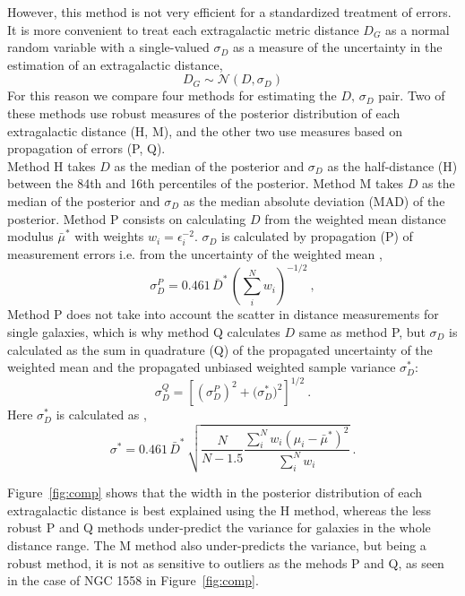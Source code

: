 \documentclass[a4paper,fleqn,usenatbib]{mnras}
\begin{document}
However, this method is not very efficient for a standardized treatment of errors. It is more convenient to treat each extragalactic metric distance $D_G$ as a normal random variable with a single-valued $\sigma_D$ as a measure of the uncertainty in the estimation of an extragalactic distance,
\[D_G\sim \mathcal{N}(D,\sigma_D)\]
For this reason we compare four methods for estimating the $D,\,\sigma_D$ pair. Two of these methods use robust measures of the posterior distribution of each extragalactic distance (H, M), and the other two use measures based on propagation of errors (P, Q).\\

Method H takes $D$ as the median of the posterior and $\sigma_D$ as the half-distance (H) between the 84th and 16th percentiles of the posterior. Method M takes $D$ as the median of the posterior and $\sigma_D$ as the median absolute deviation (MAD) of the posterior. Method P consists on calculating $D$ from the weighted mean distance modulus $\bar{\mu}^*$ with weights $w_i=\epsilon_i^{-2}$. $\sigma_D$ is calculated by propagation (P) of measurement errors  i.e. from the uncertainty of the weighted mean \citep{cosmicflows},
\begin{equation}
\sigma_D^P=0.461\,\bar{D}^*\,\left(\sum_i^Nw_i\right)^{-1/2} \ ,
\end{equation}
Method P does not take into account the scatter in distance measurements for single galaxies, which is why method Q calculates $D$ same as method P, but $\sigma_D$ is calculated as the sum in quadrature (Q) of the propagated uncertainty of the weighted mean and the propagated unbiased weighted sample variance $\sigma_D^*$:
\begin{equation}
\sigma_D^Q=\left[ \left(\sigma_D^P\right)^2+\Big(\sigma_D^*\Big)^2\right]^{1/2} \ .
\end{equation}
Here $\sigma^*_D$ is calculated as  \citep{wstdev},
\begin{equation}
\sigma^*=0.461\,\bar{D}^*\,\sqrt{\frac{N}{N-1.5}\frac{\sum_i^Nw_i(\mu_i-\bar{\mu}^*)^2}{\sum_i^Nw_i}}\ .
\end{equation}


Figure~\ref{fig:comp} shows that the width in the posterior distribution of each extragalactic distance is best explained using the H method, whereas the less robust P and Q methods under-predict the variance for galaxies in the whole distance range. The M method also under-predicts the variance, but being a robust method, it is not as sensitive to outliers as the mehods P and Q, as seen in the case of NGC 1558 in Figure~\ref{fig:comp}. \\
\end{document}
